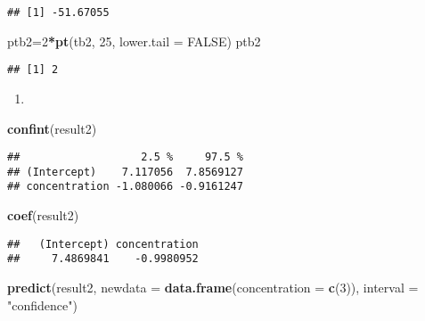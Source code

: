 \documentclass[
]{article}
\newenvironment{Shaded}{\begin{snugshade}}{\end{snugshade}}
\newcommand{\DataTypeTok}[1]{\textcolor[rgb]{0.13,0.29,0.53}{#1}}
\newcommand{\DecValTok}[1]{\textcolor[rgb]{0.00,0.00,0.81}{#1}}
\newcommand{\KeywordTok}[1]{\textcolor[rgb]{0.13,0.29,0.53}{\textbf{#1}}}
\newcommand{\NormalTok}[1]{#1}
\newcommand{\OperatorTok}[1]{\textcolor[rgb]{0.81,0.36,0.00}{\textbf{#1}}}
\newcommand{\OtherTok}[1]{\textcolor[rgb]{0.56,0.35,0.01}{#1}}
\newcommand{\StringTok}[1]{\textcolor[rgb]{0.31,0.60,0.02}{#1}}
\begin{document}
\begin{verbatim}
## [1] -51.67055
\end{verbatim}

\begin{Shaded}
\begin{Highlighting}[]
\NormalTok{ptb2=}\DecValTok{2}\OperatorTok{*}\KeywordTok{pt}\NormalTok{(tb2, }\DecValTok{25}\NormalTok{, }\DataTypeTok{lower.tail =} \OtherTok{FALSE}\NormalTok{)}
\NormalTok{ptb2}
\end{Highlighting}
\end{Shaded}

\begin{verbatim}
## [1] 2
\end{verbatim}

\begin{enumerate}
\def\labelenumi{(\alph{enumi})}
\setcounter{enumi}{5}
\item
\end{enumerate}

\begin{Shaded}
\begin{Highlighting}[]
\KeywordTok{confint}\NormalTok{(result2)}
\end{Highlighting}
\end{Shaded}

\begin{verbatim}
##                   2.5 %     97.5 %
## (Intercept)    7.117056  7.8569127
## concentration -1.080066 -0.9161247
\end{verbatim}

\begin{Shaded}
\begin{Highlighting}[]
\KeywordTok{coef}\NormalTok{(result2)}
\end{Highlighting}
\end{Shaded}

\begin{verbatim}
##   (Intercept) concentration 
##     7.4869841    -0.9980952
\end{verbatim}

\begin{Shaded}
\begin{Highlighting}[]
\KeywordTok{predict}\NormalTok{(result2, }\DataTypeTok{newdata =} \KeywordTok{data.frame}\NormalTok{(}\DataTypeTok{concentration =} \KeywordTok{c}\NormalTok{(}\DecValTok{3}\NormalTok{)), }\DataTypeTok{interval =} \StringTok{"confidence"}\NormalTok{)}
\end{Highlighting}
\end{Shaded}
\end{document}
